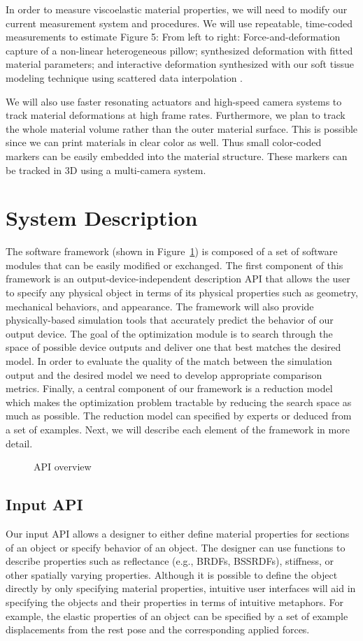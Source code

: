 \documentclass[annual]{acmsiggraph}
\begin{document}
In order to measure viscoelastic material properties, we will need to modify our current measurement
system and procedures. We will use repeatable, time-coded measurements to estimate
Figure 5: From left to right: Force-and-deformation capture of a non-linear heterogeneous pillow;
synthesized deformation with fitted material parameters; and interactive deformation synthesized
with our soft tissue modeling technique using scattered data interpolation \cite{Bickel:2010}.

We will also use faster resonating actuators and high-speed
camera systems to track material deformations at high frame rates. Furthermore, we plan to track
the whole material volume rather than the outer material surface. This is possible since we can
print materials in clear color as well. Thus small color-coded markers can be easily embedded into
the material structure. These markers can be tracked in 3D using a multi-camera system.
\section{System Description}
The software framework (shown in Figure~\ref{fig:framework}) is composed of 
a set of software
modules that can be easily modified or exchanged. The first component
of this framework is an output-device-independent description API
that allows the user to specify any physical object in terms of its physical
properties such as geometry, mechanical behaviors, and appearance. 
The framework will also provide physically-based
simulation tools that accurately predict the behavior of our output device.
The goal of the optimization module is to search through
the space of possible device outputs and deliver one that best matches the
desired model. In order to evaluate the quality of the match between the
simulation output and the desired model we need to develop appropriate
comparison metrics. Finally, a central component of our framework is
a reduction model which makes the optimization problem tractable by
reducing the search space as much as possible.
The reduction model can specified by experts or deduced from a
set of examples. Next, we will describe each element of the framework in
more detail.
\begin{figure}
\caption{API overview}
\label{fig:framework}
\end{figure}
\subsection{Input API}
Our input API allows a designer to either
define material properties for sections of an object
or specify behavior of an object. 
The designer
can use functions to describe properties such as reflectance (e.g., BRDFs, BSSRDFs), 
stiffness, or other spatially varying properties. 
Although it is possible to define the object directly by only specifying material
properties, intuitive user
interfaces will aid in specifying the objects and their properties
in terms of intuitive metaphors.
For example, the elastic properties of an object can be specified by a set of
example displacements from the rest pose and the corresponding applied forces.
\end{document}
